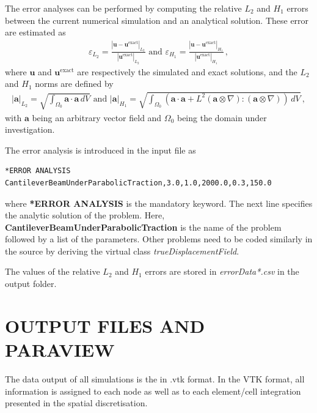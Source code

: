 \documentclass[oneside,11pt,times]{book}
\begin{document}
The error analyses can be performed by computing the relative $L_2$ and $H_1$ errors between the current numerical simulation and an analytical solution. These error are estimated as
\begin{eqnarray}
	\varepsilon_{L_2}= \frac{\left\vert\mathbf{u}-\mathbf{u}^\text{exact} \right\vert_{L_2}}{\left\vert\mathbf{u}^\text{exact} \right\vert_{L_2}} \text{ and } \varepsilon_{H_1}= \frac{\left\vert\mathbf{u}-\mathbf{u}^\text{exact} \right\vert_{H_1}}{\left\vert\mathbf{u}^\text{exact} \right\vert_{H_1}} \,,
\end{eqnarray}
where $\mathbf{u}$ and $\mathbf{u}^\text{exact}$ are respectively the simulated and exact solutions, and the $L_2$ and $H_1$ norms are defined by
\begin{eqnarray}
	\left\vert \mathbf{a} \right\vert_{L_2} = \sqrt{ \int_{\Omega_{0}} \mathbf{a} \cdot \mathbf{a}\, dV }\text{ and } \left\vert \mathbf{a} \right\vert_{H_1} = \sqrt{\int_{\Omega_{0}}\left(  \mathbf{a} \cdot \mathbf{a} + L^2 \left(\mathbf{a}\otimes \nabla\right):\left(\mathbf{a}\otimes \nabla\right) \right)  \, dV}\,,
\end{eqnarray}
with $\mathbf{a}$ being an arbitrary vector field and $\Omega_{0}$ being the domain under investigation. 

The error analysis is introduced in the input file as
\begin{lstlisting}
*ERROR ANALYSIS
CantileverBeamUnderParabolicTraction,3.0,1.0,2000.0,0.3,150.0
\end{lstlisting}
where \textbf{*ERROR ANALYSIS} is the mandatory keyword. The next line specifies the analytic solution of the problem. Here, \textbf{CantileverBeamUnderParabolicTraction} is the name of the problem followed by a list of the parameters. Other problems need to be coded similarly in the source by deriving the virtual class \emph{trueDisplacementField}. 

The values of the relative $L_2$ and $H_1$ errors are stored in \emph{errorData*.csv} in the output folder.


\chapter{OUTPUT FILES AND PARAVIEW}\label{Chapter:Paraview}

The data output of all simulations is the in .vtk format. In the VTK format, all information is assigned to each node as well as to each element/cell integration presented in the spatial discretisation.
\end{document}
